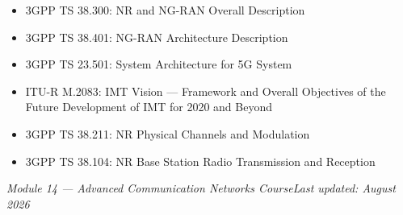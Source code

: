 
\begin{itemize}
\tightlist
\item
  3GPP TS 38.300: NR and NG-RAN Overall Description
\item
  3GPP TS 38.401: NG-RAN Architecture Description
\item
  3GPP TS 23.501: System Architecture for 5G System
\item
  ITU-R M.2083: IMT Vision — Framework and Overall Objectives of the Future Development of IMT for 2020 and Beyond
\item
  3GPP TS 38.211: NR Physical Channels and Modulation
\item
  3GPP TS 38.104: NR Base Station Radio Transmission and Reception
\end{itemize}

\emph{Module 14 — Advanced Communication Networks Course}\CNbr{}\emph{Last updated: August 2026}

